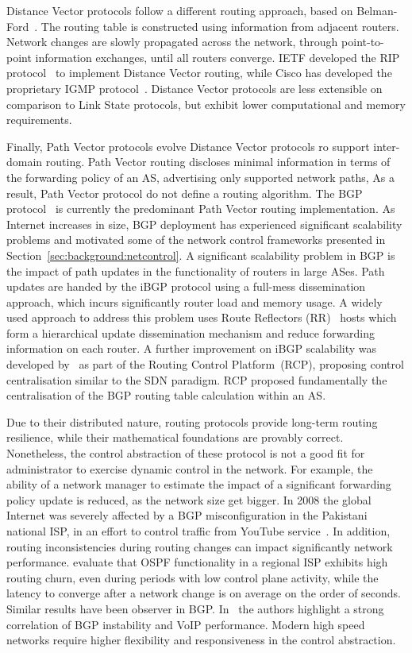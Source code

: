 Distance Vector protocols follow a different routing approach, based on
Belman-Ford~. The routing table is constructed using
information from adjacent routers. Network changes are slowly propagated across
the network, through point-to-point information exchanges, until all routers
converge.  IETF developed the RIP  protocol~ to implement Distance
Vector routing, while Cisco has developed the proprietary IGMP
protocol~. Distance Vector protocols are less extensible on
comparison to Link State protocols, but exhibit lower computational and memory
requirements.

Finally, Path Vector protocols evolve Distance Vector protocols ro support
inter-domain routing. Path Vector routing discloses minimal information in terms
of the forwarding policy of an AS, advertising only supported network paths, As
a result, Path Vector protocol do not define a routing algorithm.  The BGP
protocol~ is currently the predominant Path Vector routing
implementation.  As Internet increases in size, BGP deployment has experienced
significant scalability problems and motivated some of the network control
frameworks presented in Section~\ref{sec:background:netcontrol}.  A significant
scalability problem in BGP is the impact of path updates in the functionality of
routers in large ASes. Path updates are handed by the iBGP protocol using a
full-mess dissemination approach, which incurs significantly router load and
memory usage. A widely used approach to address this problem uses Route
Reflectors (RR)~ hosts which form a hierarchical update
dissemination mechanism and reduce forwarding information on each router. A
further improvement on iBGP scalability was developed by~ as
part of the Routing Control Platform~(RCP), proposing control centralisation
similar to the SDN paradigm. RCP proposed fundamentally the centralisation of
the BGP routing table calculation within an AS.

Due to their distributed nature, routing protocols provide long-term routing
resilience, while their mathematical foundations are provably correct.
Nonetheless, the control abstraction of these protocol is not a good fit for
administrator to exercise dynamic control in the network. For example, the
ability of a network manager to estimate the impact of a significant forwarding
policy update is reduced, as the network size get bigger.  In 2008 the global
Internet was severely affected by a BGP misconfiguration in the Pakistani
national ISP, in an effort to control traffic from YouTube
service~.  In addition, routing inconsistencies during
routing changes can impact significantly network performance.
 evaluate that OSPF functionality in a regional ISP exhibits
high routing churn, even during periods with low control plane activity, while
the latency to converge after a network change is on average on the order of
seconds. Similar results have been observer in BGP\@.  In~
the authors highlight a strong correlation of BGP instability and VoIP
performance. Modern high speed networks require higher flexibility and
responsiveness in the control abstraction. 


